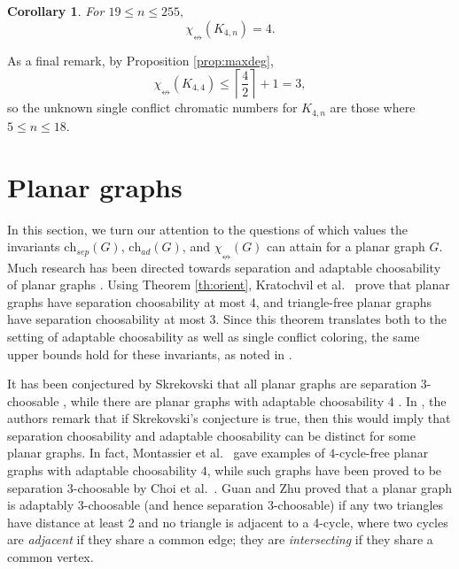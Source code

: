 \documentclass[12pt]{article}
\newtheorem{corollary}[theorem]{Corollary}
\newcommand{\chsep}{\mathrm{ch}_{sep}}
\newcommand{\chad}{\mathrm{ch}_{ad}}
\newcommand{\sing}{\chi_{\nleftrightarrow}}
\begin{document}
\begin{corollary}
    For $19\leq n\leq 255,$
    $$
    \sing(K_{4,n})=4.
    $$
\end{corollary}


As a final remark, by Proposition \ref{prop:maxdeg},
$$
\sing(K_{4,4})\leq \left \lceil\frac{4}{2}\right \rceil +1=3,
$$
so the unknown single conflict chromatic numbers for $K_{4,n}$ are 
those where $5\leq n\leq 18$.


\section{Planar graphs}

In this section, we turn our attention to the questions of which values the invariants $\chsep(G)$, $\chad(G)$, and $\sing(G)$ can attain for a planar graph $G$.
Much research has been directed towards separation and adaptable choosability of
planar graphs \cite{HellZhu,CasselgrenGranholmRaspaud,ChenLihWang,
EsperetMontassierZhu,Choi}. 
Using Theorem \ref{th:orient}, Kratochvil et al.\ \cite{KratochvilTuzaVoigt} prove that planar graphs
have separation choosability at most $4$, and triangle-free planar graphs have
separation choosability at most $3$. Since this theorem translates
both to the setting of adaptable choosability as well as single conflict coloring,
the same upper bounds hold for these invariants, as noted in 
\cite{DvorakEsperetKangOzeki}.

It has been conjectured by Skrekovski that all planar graphs are separation $3$-choosable
\cite{Skrekovski}, while there are planar graphs with adaptable choosability $4$
\cite{HellZhu}. 
In \cite{DvorakEsperetKangOzeki}, the authors remark that if Skrekovski's conjecture is true, 
then this would imply that separation choosability and adaptable choosability can be
distinct for some planar graphs. In fact,
Montassier et al.\ \cite{EsperetMontassierZhu} gave examples
of $4$-cycle-free planar graphs with adaptable choosability $4$, 
while such graphs
have been proved to be separation $3$-choosable by Choi et al.\ 
\cite{Choi}.
Guan and Zhu \cite{GuanZhu} proved that a planar graph 
is adaptably 3-choosable (and hence separation $3$-choosable) 
if any two triangles have distance at least 2 and no triangle is adjacent to a 4-cycle,
where two cycles are {\em adjacent} if they share a common
edge; they are {\em intersecting} if they share a common vertex.
\end{document}

